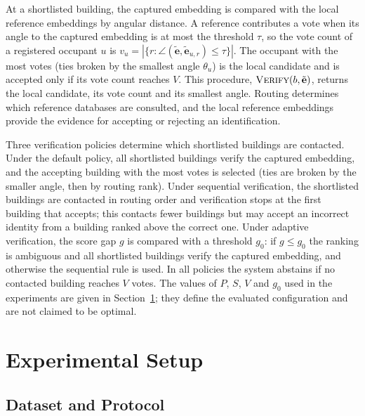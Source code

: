 \documentclass[pdflatex,sn-mathphys-num]{sn-jnl}%
\theoremstyle{thmstyleone}%
\theoremstyle{thmstyletwo}%
\theoremstyle{thmstylethree}%
\begin{document}
At a shortlisted building, the captured embedding is compared with the local reference embeddings by angular distance. A reference contributes a vote when its angle to the captured embedding is at most the threshold $\tau$, so the vote count of a registered occupant $u$ is $v_u=|\{r:\angle(\tilde{\mathbf{e}},\tilde{\mathbf{e}}_{u,r})\leq\tau\}|$. The occupant with the most votes (ties broken by the smallest angle $\theta_u$) is the local candidate and is accepted only if its vote count reaches $V$. This procedure, $\textsc{Verify}(b,\tilde{\mathbf{e}})$, returns the local candidate, its vote count and its smallest angle. Routing determines which reference databases are consulted, and the local reference embeddings provide the evidence for accepting or rejecting an identification.

Three verification policies determine which shortlisted buildings are contacted. Under the default policy, all shortlisted buildings verify the captured embedding, and the accepting building with the most votes is selected (ties are broken by the smaller angle, then by routing rank). Under sequential verification, the shortlisted buildings are contacted in routing order and verification stops at the first building that accepts; this contacts fewer buildings but may accept an incorrect identity from a building ranked above the correct one. Under adaptive verification, the score gap $g$ is compared with a threshold $g_0$: if $g\le g_0$ the ranking is ambiguous and all shortlisted buildings verify the captured embedding, and otherwise the sequential rule is used. In all policies the system abstains if no contacted building reaches $V$ votes. The values of $P$, $S$, $V$ and $g_0$ used in the experiments are given in Section~\ref{sec:setup}; they define the evaluated configuration and are not claimed to be optimal.


\section{Experimental Setup}
\label{sec:setup}

\subsection{Dataset and Protocol}
\end{document}
